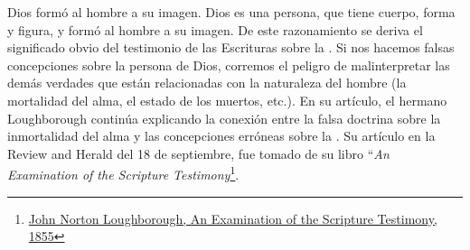 Dios formó al hombre a su imagen. Dios es una persona, que tiene cuerpo, forma y figura, y formó al hombre a su imagen. De este razonamiento se deriva el significado obvio del testimonio de las Escrituras sobre la . Si nos hacemos falsas concepciones sobre la persona de Dios, corremos el peligro de malinterpretar las demás verdades que están relacionadas con la naturaleza del hombre (la mortalidad del alma, el estado de los muertos, etc.). En su artículo, el hermano Loughborough continúa explicando la conexión entre la falsa doctrina sobre la inmortalidad del alma y las concepciones erróneas sobre la . Su artículo en la Review and Herald del 18 de septiembre, fue tomado de su libro “\textit{An Examination of the Scripture Testimony}\footnote{\href{https://egwwritings.org/?ref=en_MPC.2&para=961.2}{John Norton Loughborough, An Examination of the Scripture Testimony, 1855}}.






